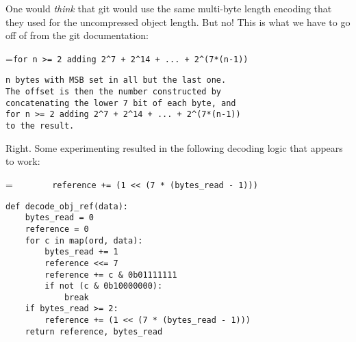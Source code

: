 \documentclass{article}
\begin{document}
One would
\emph{think} that git would use the same multi-byte length encoding that they
used for the uncompressed object length.  But no! This is what we have
to go off of from the git documentation:
\begin{center}
\begingroup
{}=\hbox{\footnotesize\verb|for n >= 2 adding 2^7 + 2^14 + ... + 2^(7*(n-1))|}
\begin{minipage}{\wd9}
\footnotesize\begin{verbatim}
n bytes with MSB set in all but the last one.
The offset is then the number constructed by
concatenating the lower 7 bit of each byte, and
for n >= 2 adding 2^7 + 2^14 + ... + 2^(7*(n-1))
to the result.
\end{verbatim}
\end{minipage}
\endgroup
\end{center}
Right. Some experimenting resulted in the following decoding logic
that appears to work:
\begin{center}
\begingroup
{}=\hbox{\footnotesize\verb|        reference += (1 << (7 * (bytes_read - 1)))|}
\begin{minipage}{\wd9}
\footnotesize
{\color{blue}\verb|def|}\verb| decode_obj_ref|{\color{gray}\verb|(|}\verb|data|{\color{gray}\verb|):|}\\
\verb|    bytes_read = 0|\\
\verb|    reference = 0|\\
\verb|    |{\color{blue}\verb|for|}\verb| c |{\color{blue}\verb|in map|}{\color{gray}\verb|(|}\verb|ord, data|{\color{gray}\verb|):|}\\
\verb|        bytes_read += 1|\\
\verb|        reference <<= 7|\\
\verb|        reference += c & 0b01111111|\\
\verb|        |{\color{blue}\verb|if not|}\verb| |{\color{gray}\verb|(|}\verb|c & 0b10000000|{\color{gray}\verb|):|}\\
{\color{blue}\verb|            break|}\\
{\color{blue}\verb|    if|}\verb| bytes_read >= 2|{\color{gray}\verb|:|}\\
\verb|        reference += |{\color{gray}\verb|(|}\verb|1 << |{\color{gray}\verb|(|}\verb|7 * |{\color{gray}\verb|(|}\verb|bytes_read - 1|{\color{gray}\verb|)))|}\\
{\color{blue}\verb|    return|}\verb| reference, bytes_read|\\
\end{minipage}
\endgroup
\end{center}
\end{document}
